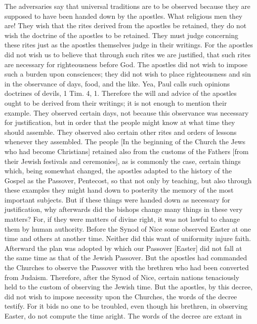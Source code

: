 The adversaries say that universal traditions are to be observed
because they are supposed to have been handed down by the apostles.
What religious men they are!  They wish that the rites derived from
the apostles be retained, they do not wish the doctrine of the
apostles to be retained.  They must judge concerning these rites just
as the apostles themselves judge in their writings.  For the apostles
did not wish us to believe that through such rites we are justified,
that such rites are necessary for righteousness before God.  The
apostles did not wish to impose such a burden upon consciences; they
did not wish to place righteousness and sin in the observance of days,
food, and the like.  Yea, Paul calls such opinions doctrines of
devils, 1 Tim. 4, 1. Therefore the will and advice of the apostles
ought to be derived from their writings; it is not enough to mention
their example.  They observed certain days, not because this
observance was necessary for justification, but in order that the
people might know at what time they should assemble.  They observed
also certain other rites and orders of lessons whenever they
assembled.  The people [In the beginning of the Church the Jews who
had become Christians] retained also from the customs of the Fathers
[from their Jewish festivals and ceremonies], as is commonly the case,
certain things which, being somewhat changed, the apostles adapted
to the history of the Gospel as the Passover, Pentecost, so that not
only by teaching, but also through these examples they might hand
down to posterity the memory of the most important subjects.  But if
these things were handed down as necessary for justification, why
afterwards did the bishops change many things in these very matters?
For, if they were matters of divine right, it was not lawful to
change them by human authority.  Before the Synod of Nice some
observed Easter at one time and others at another time.  Neither did
this want of uniformity injure faith.  Afterward the plan was adopted
by which our Passover [Easter] did not fall at the same time as that
of the Jewish Passover.  But the apostles had commanded the Churches
to observe the Passover with the brethren who had been converted from
Judaism.  Therefore, after the Synod of Nice, certain nations
tenaciously held to the custom of observing the Jewish time.  But the
apostles, by this decree, did not wish to impose necessity upon the
Churches, the words of the decree testify.  For it bids no one to be
troubled, even though his brethren, in observing Easter, do not
compute the time aright.  The words of the decree are extant in
